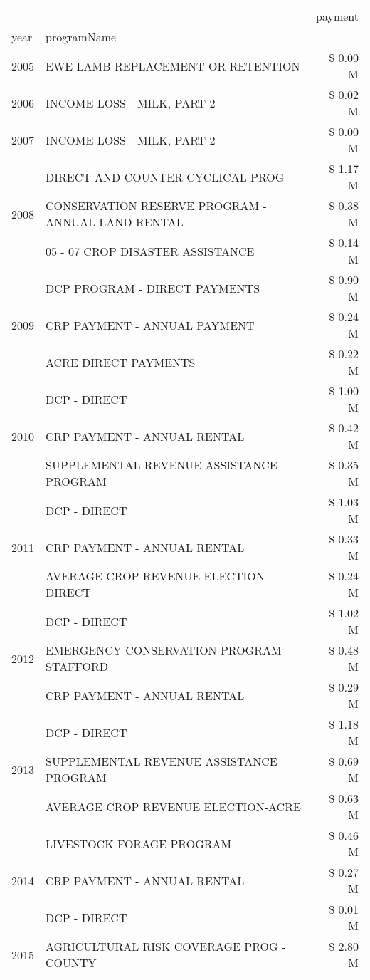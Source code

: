 \begin{tabular}{llr}
\toprule
 &  & payment \\
year & programName &  \\
\midrule
2005 & EWE LAMB REPLACEMENT OR RETENTION & \$ 0.00 M \\
\cline{1-3}
2006 & INCOME LOSS - MILK, PART 2 & \$ 0.02 M \\
\cline{1-3}
2007 & INCOME LOSS - MILK, PART 2 & \$ 0.00 M \\
\cline{1-3}
\multirow[t]{3}{*}{2008} & DIRECT AND COUNTER CYCLICAL PROG & \$ 1.17 M \\
 & CONSERVATION RESERVE PROGRAM - ANNUAL LAND RENTAL & \$ 0.38 M \\
 & 05 - 07 CROP DISASTER ASSISTANCE & \$ 0.14 M \\
\cline{1-3}
\multirow[t]{3}{*}{2009} & DCP PROGRAM - DIRECT PAYMENTS & \$ 0.90 M \\
 & CRP PAYMENT - ANNUAL PAYMENT & \$ 0.24 M \\
 & ACRE DIRECT PAYMENTS & \$ 0.22 M \\
\cline{1-3}
\multirow[t]{3}{*}{2010} & DCP - DIRECT & \$ 1.00 M \\
 & CRP PAYMENT - ANNUAL RENTAL & \$ 0.42 M \\
 & SUPPLEMENTAL REVENUE ASSISTANCE PROGRAM & \$ 0.35 M \\
\cline{1-3}
\multirow[t]{3}{*}{2011} & DCP - DIRECT & \$ 1.03 M \\
 & CRP PAYMENT - ANNUAL RENTAL & \$ 0.33 M \\
 & AVERAGE CROP REVENUE ELECTION-DIRECT & \$ 0.24 M \\
\cline{1-3}
\multirow[t]{3}{*}{2012} & DCP - DIRECT & \$ 1.02 M \\
 & EMERGENCY CONSERVATION PROGRAM STAFFORD & \$ 0.48 M \\
 & CRP PAYMENT - ANNUAL RENTAL & \$ 0.29 M \\
\cline{1-3}
\multirow[t]{3}{*}{2013} & DCP - DIRECT & \$ 1.18 M \\
 & SUPPLEMENTAL REVENUE ASSISTANCE PROGRAM & \$ 0.69 M \\
 & AVERAGE CROP REVENUE ELECTION-ACRE & \$ 0.63 M \\
\cline{1-3}
\multirow[t]{3}{*}{2014} & LIVESTOCK FORAGE PROGRAM & \$ 0.46 M \\
 & CRP PAYMENT - ANNUAL RENTAL & \$ 0.27 M \\
 & DCP - DIRECT & \$ 0.01 M \\
\cline{1-3}
\multirow[t]{3}{*}{2015} & AGRICULTURAL RISK COVERAGE PROG - COUNTY & \$ 2.80 M \\

\end{tabular}
